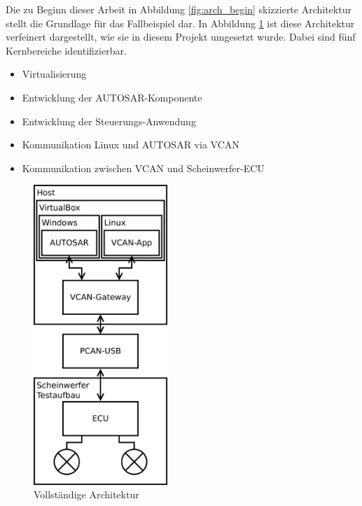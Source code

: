 \documentclass[
  a4paper,					    %
  twoside,
  DIV=calc,     				%
  bibliography=totoc,
  cleardoublepage=empty,
  ngerman,     					%
  final       					%
]{scrbook}
\begin{document}
Die zu Beginn dieser Arbeit in Abbildung \ref{fig:arch_begin} skizzierte Architektur stellt die Grundlage für das Fallbeispiel dar. In Abbildung \ref{fig:arch_finished} ist diese Architektur verfeinert dargestellt, wie sie in diesem Projekt umgesetzt wurde. Dabei sind fünf Kernbereiche identifizierbar.

\begin{itemize}
    \item Virtualisierung
    \item Entwicklung der AUTOSAR-Komponente
    \item Entwicklung der Steuerungs-Anwendung
    \item Kommunikation Linux und AUTOSAR via VCAN
    \item Kommunikation zwischen VCAN und Scheinwerfer-ECU
\end{itemize}

\begin{figure}[ht]
    \centering
    \includegraphics[width=0.45\textwidth]{arch_finished}
    \caption{Vollständige Architektur}
    \label{fig:arch_finished}
\end{figure}

\end{document}
